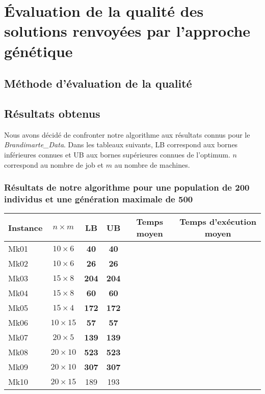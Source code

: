 \section{Évaluation de la qualité des solutions renvoyées par l'approche génétique}

\subsection{Méthode d'évaluation de la qualité}



\subsection{Résultats obtenus}

Nous avons décidé de confronter notre algorithme aux résultats connus pour le \textit{Brandimarte_Data}. Dans les tableaux suivants, LB correspond aux bornes inférieures connues et UB aux bornes supérieures connues de l'optimum. $n$ correspond au nombre de job et $m$ au nombre de machines.

\subsubsection{Résultats de notre algorithme pour une population de 200 individus et une génération maximale de 500}

\begin{table}[!h]
    \renewcommand{\arraystretch}{1.5}
    \centering
    \begin{tabular}{p{} c c c c c}
        Instance & $n \times m$ & LB & UB & Temps moyen & Temps d'exécution moyen \\
         \hline
        Mk01 & $10 \times 6$ & \textbf{40} & \textbf{40} & & \\
         \hline
        Mk02 & $10 \times 6$ & \textbf{26} & \textbf{26} & & \\
         \hline
        Mk03 & $15 \times 8$ & \textbf{204} & \textbf{204} & & \\
         \hline
        Mk04 & $15 \times 8$ & \textbf{60} & \textbf{60} & & \\
         \hline
        Mk05 & $15 \times 4$ & \textbf{172} & \textbf{172} & & \\
         \hline
        Mk06 & $10 \times 15$ & \textbf{57} & \textbf{57} & & \\
         \hline
        Mk07 & $20 \times 5$ & \textbf{139} & \textbf{139} & & \\
         \hline
        Mk08 & $20 \times 10$ & \textbf{523} & \textbf{523} & & \\
         \hline
        Mk09 & $20 \times 10$ & \textbf{307} & \textbf{307} & & \\
         \hline
        Mk10 & $20 \times 15$ & 189 & 193 \\
         \hline 
    \end{tabular}
\end{table}

